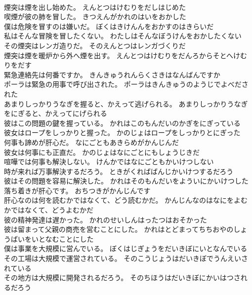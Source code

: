 \documentclass[8pt]{extreport}
\begin{document}
\begin{CJK}{UTF8}{min}
\\	煙突は煙を出し始めた。	えんとつはけむりをだしはじめた 
\\	喫煙が彼の肺を冒した。	きつえんがかれのはいをおかした 
\\	僕は危険を冒すのは嫌いだ。	ぼくはきけんんをおかすのはきらいだ 
\\	私はそんな冒険を冒したくない。	わたしはそんなぼうけんをおかしたくない 
\\	その煙突はレンガ造りだ。	そのえんとつはレンガづくりだ 
\\	煙突は煙を暖炉から外へ煙を出す。	えんとつはけむりをだんろからそとへけむりをだす 
\\	緊急連絡先は何番ですか。	きんきゅうれんらくさきはなんばんですか 
\\	ポーラは緊急の用事で呼び出された。	ポーラはきんきゅうのようじでよべだされた 
\\	あまりしっかりうなぎを握ると、かえって逃げられる。	あまりしっかりうなぎをにぎると、かえってにげられる 
\\	彼はこの問題の鍵を握っている。	かれはこのもんだいのかぎをにぎっている 
\\	彼女はロープをしっかりと握った。	かのじょはロープをしっかりとにぎった 
\\	何事も諦めが肝心だ。	なにごともあきらめがかんじんだ 
\\	彼女は何事にも正直だ。	かのじょはなにごとにもしょうじきだ 
\\	喧嘩では何事も解決しない。	けんかではなにごともかいけつしない 
\\	時が来れば万事解決するだろう。	ときがくればばんじかいけつするだろう 
\\	彼はその問題を容易に解決した。	かれはそのもんだいをよういにかいけつした 
\\	落ち着きが肝心です。	おちつきがかんじんです 
\\	肝心なのは何を読むかではなくて、どう読むかだ。	かんじんなのはなにをよむかではなくて、どうよむかだ 
\\	彼の精神発達は遅かった。	かれのせいしんはったつはおそかった 
\\	彼は留まって父親の商売を営むことにした。	かれはとどまってちちおやのしょうばいをいとなむことにした 
\\	僕は事業を大規模に営んでいる。	ぼくはじぎょうをだいきぼにいとなんでいる 
\\	その工場は大規模で運営されている。	そのこうじょうはだいきぼでうんえいされている 
\\	その地方は大規模に開発されるだろう。	そのちほうはだいきぼにかいはつされるだろう 

\end{CJK}
\end{document}
